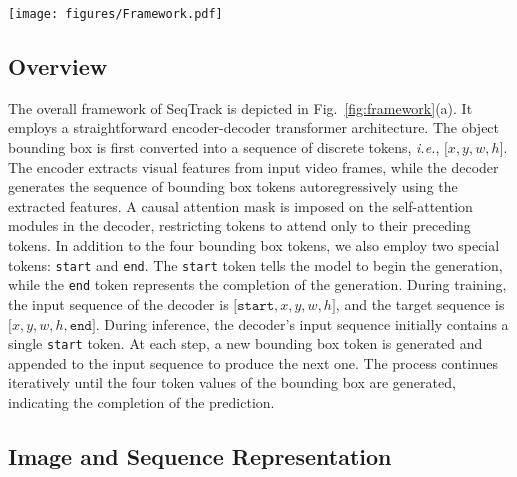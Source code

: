 \begin{figure*}[htbp]
\begin{center}
\texttt{[image: figures/Framework.pdf]}
\vspace{-3mm}
\end{center}
   \caption{(a) Architecture of the proposed SeqTrack. The key component is an encoder-decoder transformer. The encoder extracts visual features from input video frames. The causal decoder autoregressively generates the sequence of the bounding box tokens using the extracted features. (b) Detailed transformer block in the causal decoder. The input embeddings interact in a casual manner through a masked multi-head attention mechanism. The visual feature is incorporated into the decoder via a multi-head attention layer. }
\label{fig:framework}
\end{figure*}

\subsection{Overview}
\label{subsec:overview}

The overall framework of SeqTrack is depicted in Fig.~\ref{fig:framework}(a). It employs a straightforward encoder-decoder transformer architecture. The object bounding box is first converted into a sequence of discrete tokens, \emph{i.e.}, $[x,$$y,$$w,$$h]$.
The encoder extracts visual features from input video frames, while the decoder generates the sequence of bounding box tokens autoregressively using the extracted features. A causal attention mask is imposed on the self-attention modules in the decoder, restricting tokens to attend only to their preceding tokens.
In addition to the four bounding box tokens, we also employ two special tokens: \texttt{start} and \texttt{end}.
The \texttt{start} token tells the model to begin the generation, while the \texttt{end} token represents the completion of the generation.
During training, the input sequence of the decoder is $[\texttt{start},$$x,$$y,$$w,$$h]$, and the target sequence is $[x,$$y,$$w,$$h,$$\texttt{end}]$.
During inference, the decoder's input sequence initially contains a single \texttt{start} token.
At each step, a new bounding box token is generated and appended to the input sequence to produce the next one. The process continues iteratively until the four token values of the bounding box are generated, indicating the completion of the prediction.

\subsection{Image and Sequence Representation}
\label{subsec:representation}

